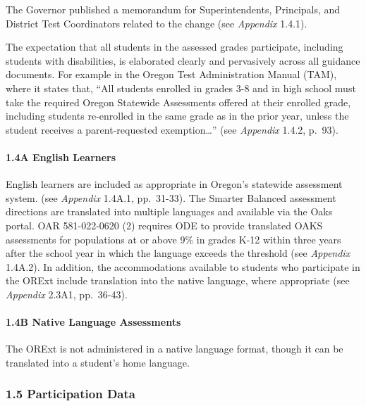 \documentclass[]{article}
\let\oldparagraph\paragraph
\renewcommand{\paragraph}[1]{\oldparagraph{#1}\mbox{}}
\begin{document}
The Governor published a memorandum for Superintendents, Principals, and
District Test Coordinators related to the change (see \emph{Appendix}
1.4.1).

The expectation that all students in the assessed grades participate,
including students with disabilities, is elaborated clearly and
pervasively across all guidance documents. For example in the Oregon
Test Administration Manual (TAM), where it states that, ``All students
enrolled in grades 3-8 and in high school must take the required Oregon
Statewide Assessments offered at their enrolled grade, including
students re-enrolled in the same grade as in the prior year, unless the
student receives a parent-requested exemption\ldots{}'' (see
\emph{Appendix} 1.4.2, p.~93).

\hypertarget{a-english-learners}{%
\paragraph{1.4A English Learners}\label{a-english-learners}}

English learners are included as appropriate in Oregon's statewide
assessment system. (see \emph{Appendix} 1.4A.1, pp.~31-33). The Smarter
Balanced assessment directions are translated into multiple languages
and available via the Oaks portal. OAR 581-022-0620 (2) requires ODE to
provide translated OAKS assessments for populations at or above 9\% in
grades K-12 within three years after the school year in which the
language exceeds the threshold (see \emph{Appendix} 1.4A.2). In
addition, the accommodations available to students who participate in
the ORExt include translation into the native language, where
appropriate (see \emph{Appendix} 2.3A1, pp.~36-43).

\hypertarget{b-native-language-assessments}{%
\paragraph{1.4B Native Language
Assessments}\label{b-native-language-assessments}}

The ORExt is not administered in a native language format, though it can
be translated into a student's home language.

\hypertarget{participation-data}{%
\subsubsection{1.5 Participation Data}\label{participation-data}}
\end{document}
